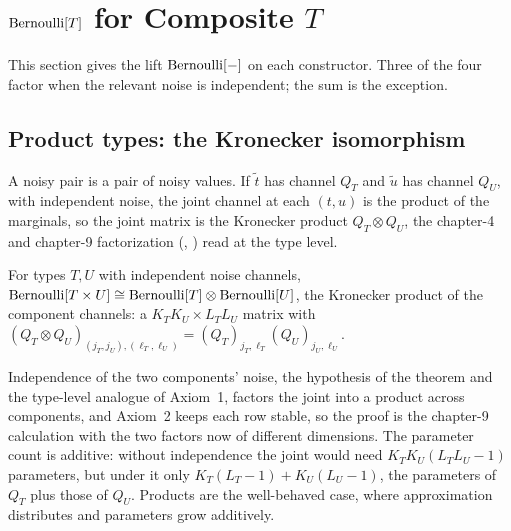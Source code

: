 %

\section{\texorpdfstring{$\mathrm{Bernoulli}[T]$}{Bernoulli T} for Composite \texorpdfstring{$T$}{T}}
\label{sec:bernoulli-of-composite}

This section gives the lift $\mathrm{Bernoulli}[-]$ on each constructor. Three of the
four factor when the relevant noise is independent; the sum is the exception.

\subsection*{Product types: the Kronecker isomorphism}

A noisy pair is a pair of noisy values. If $\tilde t$ has channel $Q_T$ and
$\tilde u$ has channel $Q_U$, with independent noise, the joint channel at each
$(t, u)$ is the product of the marginals, so the joint matrix is the Kronecker
product $Q_T \otimes Q_U$, the chapter-4 and chapter-9 factorization
(, ) read at the type level.

\begin{theorem}
\label{thm:bernoulli-product}
For types $T, U$ with independent noise channels, $\mathrm{Bernoulli}[T \times U] \cong
\mathrm{Bernoulli}[T] \otimes \mathrm{Bernoulli}[U]$, the Kronecker product of the component
channels: a $K_T K_U \times L_T L_U$ matrix with $(Q_T \otimes Q_U)_{(j_T, j_U),
(\ell_T, \ell_U)} = (Q_T)_{j_T, \ell_T}(Q_U)_{j_U, \ell_U}$.
\end{theorem}

Independence of the two components' noise, the hypothesis of the theorem and
the type-level analogue of Axiom~1, factors the joint into a product across
components, and Axiom~2 keeps each row stable, so the proof is the chapter-9
calculation with the two factors now of different dimensions. The parameter count is additive: without independence the
joint would need $K_T K_U(L_T L_U - 1)$ parameters, but under it only $K_T(L_T -
1) + K_U(L_U - 1)$, the parameters of $Q_T$ plus those of $Q_U$. Products are the
well-behaved case, where approximation distributes and parameters grow
additively.

